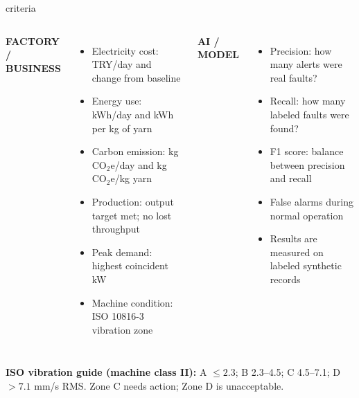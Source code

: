 \documentclass[aspectratio=169,10pt]{beamer}
\begin{document}
\begin{frame}{criteria}
\normalsize
\begin{columns}[T,onlytextwidth]
{\color{Teal}\bfseries FACTORY / BUSINESS}\par\vspace{2mm}
\begin{itemize}\setlength\itemsep{2pt}
  \item Electricity cost: TRY/day and change from baseline
  \item Energy use: kWh/day and kWh per kg of yarn
  \item Carbon emission: kg CO$_2$e/day and kg CO$_2$e/kg yarn
  \item Production: output target met; no lost throughput
  \item Peak demand: highest coincident kW
  \item Machine condition: ISO 10816-3 vibration zone
\end{itemize}
{\color{Blue}\bfseries AI / MODEL}\par\vspace{2mm}
\begin{itemize}\setlength\itemsep{2pt}
  \item Precision: how many alerts were real faults?
  \item Recall: how many labeled faults were found?
  \item F1 score: balance between precision and recall
  \item False alarms during normal operation
  \item Results are measured on labeled synthetic records
\end{itemize}
\end{columns}
\vspace{1mm}
\footnotesize\textbf{ISO vibration guide (machine class II):} A $\leq 2.3$; B 2.3--4.5; C 4.5--7.1; D $>7.1$ mm/s RMS. Zone C needs action; Zone D is unacceptable.
\end{frame}
\end{document}

